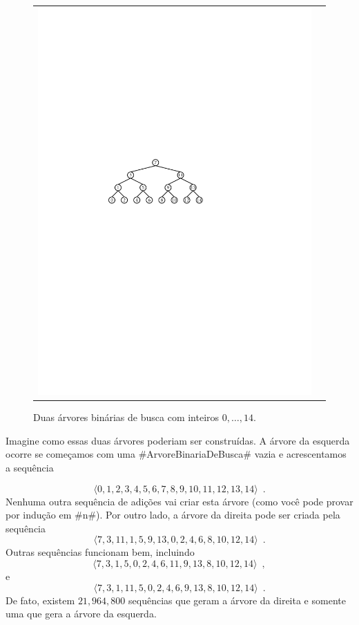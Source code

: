 \begin{figure}
\begin{center}
\begin{tabular}{cc}
      \includegraphics[scale=0.90909,scale=0.95]{figs/bst-balanced}
    \end{tabular}
  \end{center}
  \caption{Duas árvores binárias de busca com inteiros $0,\ldots,14$.}
\end{figure}

Imagine como essas duas árvores poderiam ser construídas.  A árvore da esquerda ocorre se começamos com uma #ArvoreBinariaDeBusca# vazia e acrescentamos a sequência

\[
    \langle 0,1,2,3,4,5,6,7,8,9,10,11,12,13,14 \rangle \enspace .
\]
Nenhuma outra sequência de adições vai criar esta árvore (como você pode provar por indução em #n#). Por outro lado, a árvore da direita pode ser criada pela sequência
\[
    \langle 7,3,11,1,5,9,13,0,2,4,6,8,10,12,14 \rangle  \enspace .
\]
Outras sequências funcionam bem, incluindo
\[
    \langle 7,3,1,5,0,2,4,6,11,9,13,8,10,12,14 \rangle  \enspace ,
\]
e
\[
    \langle 7,3,1,11,5,0,2,4,6,9,13,8,10,12,14 \rangle \enspace .
\]
De fato, existem $21,964,800$ sequências que geram a árvore da direita e somente uma que gera a árvore da esquerda.

